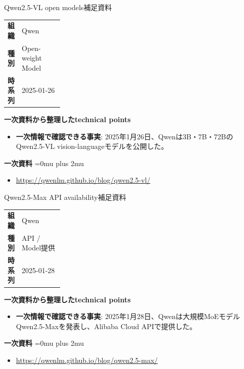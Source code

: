 \begin{technicalnote}{Qwen2.5-VL open models}{補足資料}
\begingroup
\begin{tabularx}{\linewidth}{@{}>{\bfseries}p{0.22\linewidth}X@{}}
組織 & Qwen \\
種別 & Open-weight Model \\
時系列 & 2025-01-26 \\
\end{tabularx}
\smallskip
{\bfseries 一次資料から整理したtechnical points}
\begin{itemize}[leftmargin=1.5em,itemsep=0.35em]
\item \textbf{一次情報で確認できる事実}: 2025年1月26日、Qwenは3B・7B・72BのQwen2.5-VL vision-languageモデルを公開した。
\end{itemize}
\begin{samepage}
{\bfseries 一次資料}
\begingroup\sloppy
\Urlmuskip=0mu plus 2mu\relax
\begin{itemize}[leftmargin=1.5em,itemsep=0.25em]
\item {\scriptsize\url{https://qwenlm.github.io/blog/qwen2.5-vl/}}
\end{itemize}
\endgroup
\end{samepage}
\endgroup
\end{technicalnote}
\medskip

\begin{technicalnote}{Qwen2.5-Max API availability}{補足資料}
\begingroup
\begin{tabularx}{\linewidth}{@{}>{\bfseries}p{0.22\linewidth}X@{}}
組織 & Qwen \\
種別 & API / Model提供 \\
時系列 & 2025-01-28 \\
\end{tabularx}
\smallskip
{\bfseries 一次資料から整理したtechnical points}
\begin{itemize}[leftmargin=1.5em,itemsep=0.35em]
\item \textbf{一次情報で確認できる事実}: 2025年1月28日、Qwenは大規模MoEモデルQwen2.5-Maxを発表し、Alibaba Cloud APIで提供した。
\end{itemize}
\begin{samepage}
{\bfseries 一次資料}
\begingroup\sloppy
\Urlmuskip=0mu plus 2mu\relax
\begin{itemize}[leftmargin=1.5em,itemsep=0.25em]
\item {\scriptsize\url{https://qwenlm.github.io/blog/qwen2.5-max/}}
\end{itemize}
\endgroup
\end{samepage}
\endgroup
\end{technicalnote}
\medskip


